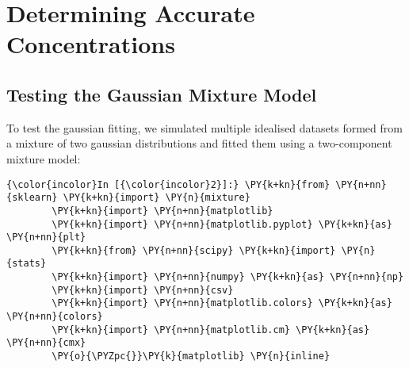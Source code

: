 


\section{Determining Accurate Concentrations}
\subsection{Testing the Gaussian Mixture Model}
\label{app:code_samples_GMM}
To test the gaussian fitting, we simulated multiple idealised datasets formed from a mixture of two gaussian distributions and fitted them using a two-component mixture model:

\begin{Verbatim}[commandchars=\\\{\}, fontsize=\scriptsize]
{\color{incolor}In [{\color{incolor}2}]:} \PY{k+kn}{from} \PY{n+nn}{sklearn} \PY{k+kn}{import} \PY{n}{mixture}
        \PY{k+kn}{import} \PY{n+nn}{matplotlib}
        \PY{k+kn}{import} \PY{n+nn}{matplotlib.pyplot} \PY{k+kn}{as} \PY{n+nn}{plt}
        \PY{k+kn}{from} \PY{n+nn}{scipy} \PY{k+kn}{import} \PY{n}{stats}
        \PY{k+kn}{import} \PY{n+nn}{numpy} \PY{k+kn}{as} \PY{n+nn}{np}
        \PY{k+kn}{import} \PY{n+nn}{csv}
        \PY{k+kn}{import} \PY{n+nn}{matplotlib.colors} \PY{k+kn}{as} \PY{n+nn}{colors}
        \PY{k+kn}{import} \PY{n+nn}{matplotlib.cm} \PY{k+kn}{as} \PY{n+nn}{cmx}
        \PY{o}{\PYZpc{}}\PY{k}{matplotlib} \PY{n}{inline}
        

\end{Verbatim}
